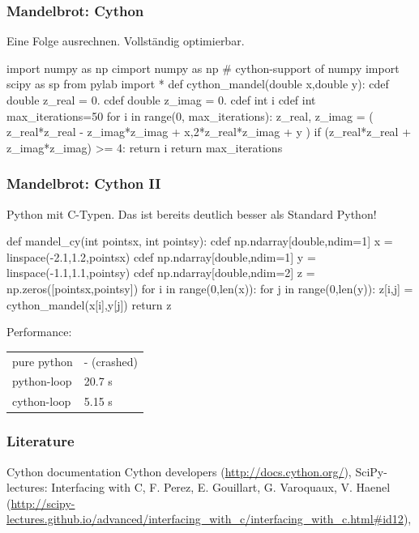 \documentclass[hyperref={xetex}]{beamer}
\begin{document}
\begin{frame}[fragile]\frametitle{Mandelbrot: Cython}
  Eine Folge ausrechnen. Vollständig optimierbar.
  \begin{pyin}
import numpy as np  
cimport numpy as np #  cython-support of numpy
import scipy as sp  
from pylab import *   
def cython_mandel(double x,double y):
    cdef double z_real = 0.
    cdef double z_imag = 0.
    cdef int i
    cdef int max_iterations=50
    for i in range(0, max_iterations):
        z_real, z_imag = ( z_real*z_real - z_imag*z_imag + x,2*z_real*z_imag + y )
        if (z_real*z_real + z_imag*z_imag) >= 4:
            return i
    return max_iterations    
  \end{pyin}
\end{frame}
 
  \begin{frame}[fragile]\frametitle{Mandelbrot: Cython II}
Python mit C-Typen. Das ist bereits deutlich besser als Standard Python!
    \begin{pyin}
def mandel_cy(int pointsx, int pointsy):
    cdef np.ndarray[double,ndim=1] x = linspace(-2.1,1.2,pointsx)
    cdef np.ndarray[double,ndim=1] y = linspace(-1.1,1.1,pointsy)
    cdef np.ndarray[double,ndim=2] z = np.zeros([pointsx,pointsy])
    for i in range(0,len(x)):
        for j in range(0,len(y)):        
            z[i,j] = cython_mandel(x[i],y[j])
    return z      
    \end{pyin}
    Performance:
    \begin{tabular}[c]{ll}
    pure python & - (crashed) \\
    python-loop & 20.7 s\\
    cython-loop & 5.15 s
  \end{tabular}
\end{frame}
    
\begin{frame}[fragile]\frametitle{Literature}
  \begin{thebibliography}{10}
      \small
     \alert{Cython documentation} Cython developers (\url{http://docs.cython.org/}),
     \alert{SciPy-lectures: Interfacing with C}, F. Perez, E. Gouillart, G. Varoquaux, V. Haenel (\url{http://scipy-lectures.github.io/advanced/interfacing_with_c/interfacing_with_c.html#id12}),
  \end{thebibliography}
  
\end{frame}

  
\end{document}
